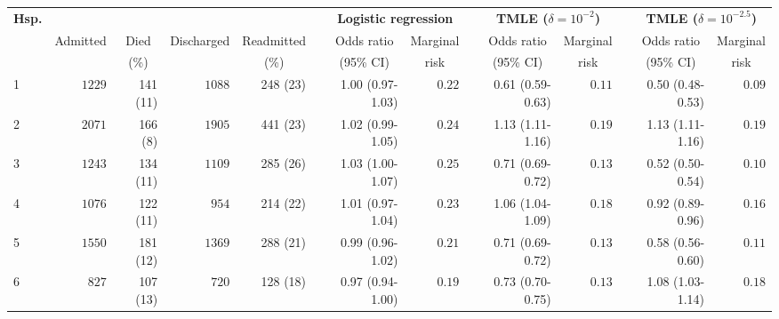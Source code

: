 \documentclass[]{article}\usepackage[]{graphicx}\usepackage[]{color}
\begin{document}
\begin{landscape}
\begin{table}[!tbp]
\end{table}
\begin{table}[!tbp]
\begin{center}
\begin{tabular}{lrrrrcrrcrrcrr}
\hline\hline
\multicolumn{1}{l}{\bfseries Hsp.}&\multicolumn{4}{c}{\bfseries }&\multicolumn{1}{c}{\bfseries }&\multicolumn{2}{c}{\bfseries Logistic regression}&\multicolumn{1}{c}{\bfseries }&\multicolumn{2}{c}{\bfseries TMLE ($\delta=10^{-2}$)}&\multicolumn{1}{c}{\bfseries }&\multicolumn{2}{c}{\bfseries TMLE ($\delta=10^{-2.5}$)}\tabularnewline
\cline{7-8} \cline{10-11} \cline{13-14}
\multicolumn{1}{l}{}&\multicolumn{1}{c}{Admitted}&\multicolumn{1}{c}{Died}&\multicolumn{1}{c}{Discharged}&\multicolumn{1}{c}{Readmitted}&\multicolumn{1}{c}{}&\multicolumn{1}{c}{Odds ratio}&\multicolumn{1}{c}{Marginal}&\multicolumn{1}{c}{}&\multicolumn{1}{c}{Odds ratio}&\multicolumn{1}{c}{Marginal}&\multicolumn{1}{c}{}&\multicolumn{1}{c}{Odds ratio}&\multicolumn{1}{c}{Marginal}\tabularnewline
&&\multicolumn{1}{c}{{\scriptsize (\%)}}&&\multicolumn{1}{c}{{\scriptsize (\%)}}&&\multicolumn{1}{c}{{\scriptsize (95\% CI)}}&\multicolumn{1}{c}{{\scriptsize risk}}&&\multicolumn{1}{c}{{\scriptsize (95\% CI)}}&\multicolumn{1}{c}{{\scriptsize risk}}&&\multicolumn{1}{c}{{\scriptsize (95\% CI)}}&\multicolumn{1}{c}{{\scriptsize risk}}\tabularnewline
\hline
1&$1229$&141 (11)&$1088$&248 (23)&&1.00 (0.97-1.03)&$0.22$&&0.61 (0.59-0.63)&$0.11$&&0.50 (0.48-0.53)&$0.09$\tabularnewline
2&$2071$&166 (8)&$1905$&441 (23)&&1.02 (0.99-1.05)&$0.24$&&1.13 (1.11-1.16)&$0.19$&&1.13 (1.11-1.16)&$0.19$\tabularnewline
3&$1243$&134 (11)&$1109$&285 (26)&&1.03 (1.00-1.07)&$0.25$&&0.71 (0.69-0.72)&$0.13$&&0.52 (0.50-0.54)&$0.10$\tabularnewline
4&$1076$&122 (11)&$ 954$&214 (22)&&1.01 (0.97-1.04)&$0.23$&&1.06 (1.04-1.09)&$0.18$&&0.92 (0.89-0.96)&$0.16$\tabularnewline
5&$1550$&181 (12)&$1369$&288 (21)&&0.99 (0.96-1.02)&$0.21$&&0.71 (0.69-0.72)&$0.13$&&0.58 (0.56-0.60)&$0.11$\tabularnewline
6&$ 827$&107 (13)&$ 720$&128 (18)&&0.97 (0.94-1.00)&$0.19$&&0.73 (0.70-0.75)&$0.13$&&1.08 (1.03-1.14)&$0.18$\tabularnewline

\end{tabular}
\end{center}
\end{table}
\end{landscape}
\end{document}
